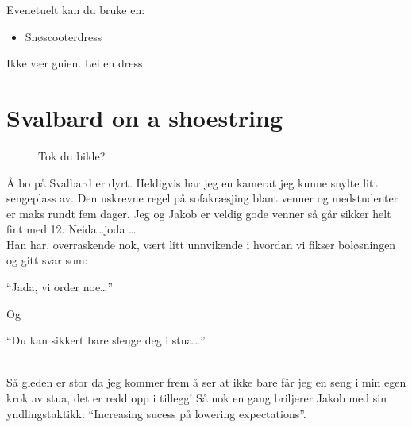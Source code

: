 Evenetuelt kan du bruke en:

\begin{itemize}
		\item Snøscooterdress
\end{itemize}

Ikke vær gnien. Lei en dress. \\

\section*{Svalbard on a shoestring}

\begin{figure}[H]
	\centering
	\noindent{}
	\caption*{Tok du bilde?}
\label{fig:tokdubilde}
\end{figure}

Å bo på Svalbard er dyrt. Heldigvis har jeg en kamerat jeg
kunne snylte litt sengeplass av. Den uskrevne regel på sofakræsjing
blant venner og medstudenter er maks rundt fem dager. Jeg og Jakob er veldig gode venner så går sikker helt fint
med 12. Neida\ldots joda \ldots  \\

Han har, overraskende nok, vært litt unnvikende i hvordan vi fikser
boløsningen og
gitt svar som: 
\begin{dialogue}
	\item ``Jada, vi order noe\ldots''
\end{dialogue}
Og 
\begin{dialogue}
	\item ``Du kan sikkert bare slenge deg i stua\ldots''
\end{dialogue}\\
Så gleden er stor da jeg kommer frem
å ser at ikke bare får jeg en seng i min egen krok av stua, det er
redd opp i tillegg! Så nok en gang briljerer Jakob med sin
yndlingstaktikk: ``Increasing sucess på lowering expectations''.\\





